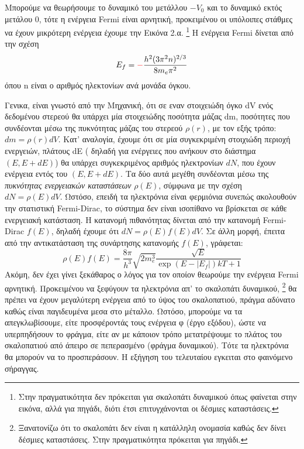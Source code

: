 \documentclass[a4paper]{article}
\begin{document}
Μπορούμε να θεωρήσουμε το δυναμικό του μετάλλου $-V_0$ και το δυναμικό εκτός μετάλου $0$, τότε η ενέργεια Fermi είναι αρνητική, προκειμένου οι υπόλοιπες στάθμες να έχουν 
μικρότερη ενέργεια 
έχουμε την Εικόνα 2.α.
\footnote{Στην πραγματικότητα δεν πρόκειται για σκαλοπάτι δυναμικού όπως φαίνεται στην εικόνα, αλλά για πηγάδι, διότι έτσι επιτυγχάνονται οι δέσμιες καταστάσεις.}
 Η ενέργεια Fermi δίνεται από την σχέση 
 \begin{equation}
 	E_f =\textcolor{red}{-} \frac{h^2(3\pi^2 n)^{2/3}}{8m_e\pi^2}
 \end{equation}
όπου n είναι ο αριθμός ηλεκτονίων ανά μονάδα όγκου.

Γενικα, είναι γνωστό από την Μηχανική, ότι σε εναν στοιχειώδη όγκο dV ενός δεδομένου στερεού θα υπάρχει μία στοιχειώδης ποσότητα μάζας dm, ποσότητες που συνδέονται μέσω της πυκνότητας μάζας του στερεού $\rho(r)$, με τον εξής τρόπο: $dm=\rho(r) dV$.
 Κατ' αναλογία, έχουμε ότι σε μία συγκεκριμένη στοιχιώδη περιοχή ενεργειών, πλάτους dE ( δηλαδή για ενέργειες που ανήκουν στο διάστημα $(E,E+dE)$) θα υπάρχει συγκεκριμένος αριθμός ηλεκτρονίων $dN$, που έχουν ενέργεια εντός του $(E,E+dE)$. Τα δύο αυτά μεγέθη συνδέονται μέσω της \textit{πυκνότητας ενεργειακών καταστάσεων} $\rho (E)$, σύμφωνα με την σχέση $dN=\rho(E)dV$. Ωστόσο, επειδή τα ηλεκτρόνια είναι φερμιόνια συνεπώς ακολουθούν την στατιστική Fermi-Dirac, το σύστημα δεν είναι ισοπίθανο να βρίσκεται σε κάθε ενεργειακή κατάσταση. Η κατανομή πιθανότητας δίνεται από την κατανομή Fermi-Dirac $f(E)$, δηλαδή έχουμε ότι $dN=\rho(E)f(E)dV$. Σε άλλη μορφή, έπειτα από την αντικατάσταση της συνάρτησης κατανομής $f(E)$, γράφεται: 
\begin{equation}
\rho(E)f(E) = \frac{8\pi}{h^3}\sqrt{2m_e^3}\frac{\sqrt{E}}{\exp{(E-|E_f|)kT}+1}
\end{equation}
\newpage
Ακόμη, δεν έχει γίνει ξεκάθαρος ο λόγος για τον οποίον θεωρούμε την ενέργεια Fermi αρνητική. Προκειμένου να ξεφύγουν τα ηλεκτρόνια απ' το σκαλοπάτι δυναμικού,
\footnote{Ξανατονίζω ότι το σκαλοπάτι δεν είναι η κατάλληλη ονομασία καθώς δεν δίνει δέσμιες καταστάσεις. Στην πραγματικότητα πρόκειται για πηγάδι.} 
θα πρέπει να έχουν μεγαλύτερη ενέργεια από το ύψος του σκαλοπατιού, πράγμα αδύνατο καθώς είναι παγιδευμένα μεσα στο μέταλλο. Ωστόσο, μπορούμε να τα απεγκλωβίσουμε, είτε προσφέροντάς τους ενέργεια φ (έργο εξόδου), ώστε να υπερπηδήσουν το φράγμα, είτε αν με κάποιον τρόπο μετατρέψουμε το πλάτος του σκαλοπατιού από άπειρο σε πεπερασμένο (φράγμα δυναμικού). Τότε τα ηλεκτρόνια θα μπορούν να το προσπεράσουν. Η εξήγηση του τελευταίου εγκειται στο φαινόμενο σήραγγας.
\end{document}
